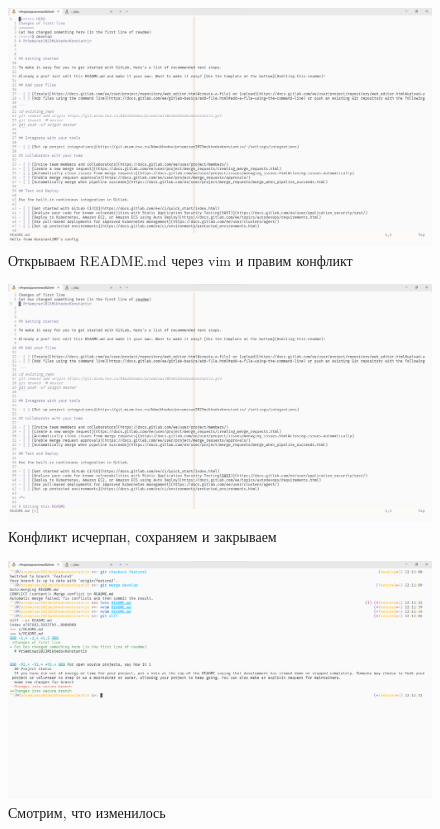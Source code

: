 \documentclass[a4paper]{article}
\begin{document}
  \begin{figure}[H]
    \centering
    \includegraphics[width=\textwidth]{1_ (10)}
    \caption{Открываем README.md через vim и правим конфликт}
  \end{figure}

  \begin{figure}[H]
    \centering
    \includegraphics[width=\textwidth]{1_ (9)}
    \caption{Конфликт исчерпан, сохраняем и закрываем}
  \end{figure}

  \begin{figure}[H]
    \centering
    \includegraphics[width=\textwidth]{1_ (8)}
    \caption{Смотрим, что изменилось}
  \end{figure}
\end{document}
